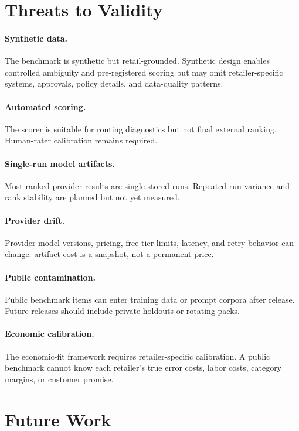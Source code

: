 \documentclass[11pt]{article}
\begin{document}
\section{Threats to Validity}

\paragraph{Synthetic data.}
The benchmark is synthetic but retail-grounded. Synthetic design enables controlled ambiguity and pre-registered scoring but may omit retailer-specific systems, approvals, policy details, and data-quality patterns.

\paragraph{Automated scoring.}
The scorer is suitable for routing diagnostics but not final external ranking. Human-rater calibration remains required.

\paragraph{Single-run model artifacts.}
Most ranked provider results are single stored runs. Repeated-run variance and rank stability are planned but not yet measured.

\paragraph{Provider drift.}
Provider model versions, pricing, free-tier limits, latency, and retry behavior can change. artifact cost is a snapshot, not a permanent price.

\paragraph{Public contamination.}
Public benchmark items can enter training data or prompt corpora after release. Future releases should include private holdouts or rotating packs.

\paragraph{Economic calibration.}
The economic-fit framework requires retailer-specific calibration. A public benchmark cannot know each retailer's true error costs, labor costs, category margins, or customer promise.

\section{Future Work}
\end{document}
